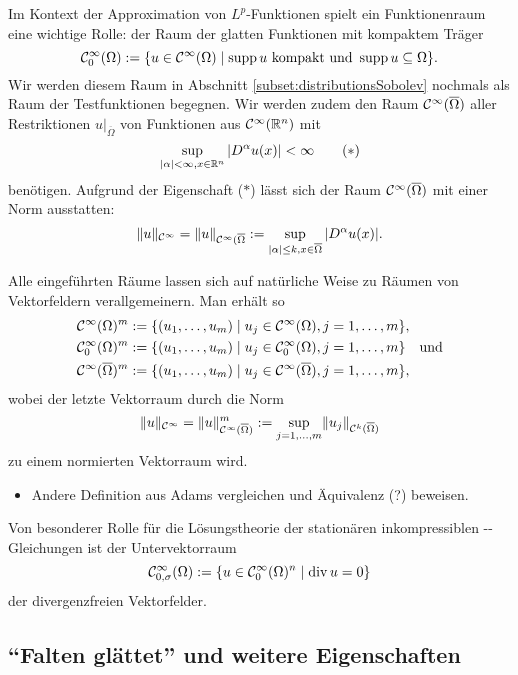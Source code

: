 Im Kontext der Approximation von $L^p$-Funktionen spielt ein Funktionenraum eine wichtige Rolle: der Raum der glatten Funktionen mit kompaktem Träger
$$
\mathcal{C}_0^\infty(\Omega) := \{ u \in \mathcal{C}^\infty(\Omega) \mid \operatorname{supp} u \text{ kompakt und } \operatorname{supp} u \subseteq \Omega\}.
$$
Wir werden diesem Raum in Abschnitt \ref{subset:distributionsSobolev} nochmals als Raum der Testfunktionen begegnen.
Wir werden zudem den Raum $\mathcal{C}^\infty(\overline\Omega)$ aller Restriktionen $u|_{\overline\Omega}$ von Funktionen aus $\mathcal{C}^\infty(\mathbb{R}^n)$ mit
\begin{displaymath}
  \sup_{|\alpha| < \infty, x \in \mathbb{R}^n} |D^\alpha u(x)| < \infty \tag{$\ast$}
\end{displaymath}
benötigen.
Aufgrund der Eigenschaft ($\ast$) lässt sich der Raum $\mathcal{C}^\infty(\overline\Omega)$ mit einer Norm ausstatten:
$$
\lVert u \rVert_{\mathcal{C}^\infty} = \lVert u \rVert_{\mathcal{C}^\infty(\overline\Omega} := \sup_{|\alpha|\leq k, x \in \overline\Omega} |D^\alpha u(x)|.
$$

Alle eingeführten Räume lassen sich auf natürliche Weise zu Räumen von Vektorfeldern verallgemeinern.
Man erhält so
\begin{align*}
  \mathcal{C}^\infty(\Omega)^m &:= \{(u_1,\dots,u_m) \mid u_j \in \mathcal{C}^\infty(\Omega), j = 1,\dots,m\}, \\
  \mathcal{C}_0^\infty(\Omega)^m &:= \{(u_1,\dots,u_m) \mid u_j \in \mathcal{C}_0^\infty(\Omega), j = 1,\dots,m\} \quad\text{und} \\
  \mathcal{C}^\infty(\overline\Omega)^m &:= \{(u_1,\dots,u_m) \mid u_j \in \mathcal{C}^\infty(\overline\Omega), j = 1,\dots,m\},
\end{align*}
wobei der letzte Vektorraum durch die Norm
$$
\lVert u \rVert_{\mathcal{C}^\infty} = \lVert u \rVert_{\mathcal{C}^\infty(\overline\Omega)}^m := \sup_{j = 1,\dots, m} \lVert u_j \rVert_{\mathcal{C}^k(\overline\Omega)}
$$
zu einem normierten Vektorraum wird.

\begin{itemize}
  \item Andere Definition aus Adams vergleichen und Äquivalenz (?) beweisen.
\end{itemize}

Von besonderer Rolle für die Lösungstheorie der stationären inkompressiblen \navier\hyp{}\stokes\hyp{}Gleichungen ist der Untervektorraum
$$
\mathcal{C}_{0,\sigma}^\infty(\Omega) := \{u \in \mathcal{C}_0^\infty(\Omega)^n \mid \mathrm{div\,} u = 0\}
$$
der divergenzfreien Vektorfelder.

\subsection{``Falten glättet'' und weitere Eigenschaften}
\label{subsec:mollification}

